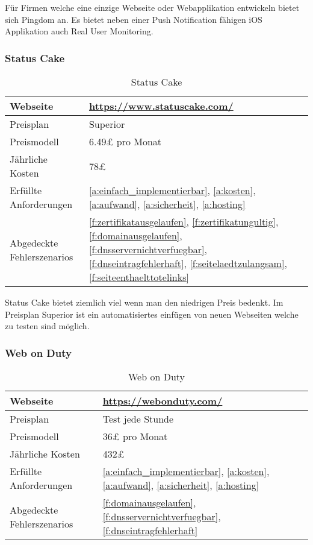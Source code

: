 Für Firmen welche eine einzige Webseite oder Webapplikation entwickeln bietet sich Pingdom an. Es bietet neben einer Push Notification fähigen iOS Applikation auch Real User Monitoring.

\subsubsection{Status Cake}
\label{ssub:status_cake}

\begin{table}[h!]
  \centering
  \begin{tabular}{p{5cm} p{7cm}}
  \toprule
    Webseite & \url{https://www.statuscake.com/}\\
  \hline
    Preisplan & Superior\\
  \hline
    Preismodell & 6.49£ pro Monat\\
  \hline
    Jährliche Kosten & 78£\\
  \hline
    Erfüllte Anforderungen & \ref{a:einfach_implementierbar}, \ref{a:kosten}, \ref{a:aufwand}, \ref{a:sicherheit}, \ref{a:hosting}\\
  \hline
    Abgedeckte Fehlerszenarios & \ref{f:zertifikatausgelaufen}, \ref{f:zertifikatungultig}, \ref{f:domainausgelaufen}, \ref{f:dnsservernichtverfuegbar}, \ref{f:dnseintragfehlerhaft}, \ref{f:seitelaedtzulangsam}, \ref{f:seiteenthaelttotelinks}\\
  \bottomrule
  \end{tabular}
  \caption{Status Cake}
  \label{tab:status_cake}
\end{table}

Status Cake bietet ziemlich viel wenn man den niedrigen Preis bedenkt. Im Preisplan Superior ist ein automatisiertes einfügen von neuen Webseiten welche zu testen sind möglich.

\subsubsection{Web on Duty}
\label{ssub:web_on_duty}

\begin{table}[h!]
  \centering
  \begin{tabular}{p{5cm} p{7cm}}
  \toprule
    Webseite & \url{https://webonduty.com/}\\
  \hline
    Preisplan & Test jede Stunde\\
  \hline
    Preismodell & 36£ pro Monat\\
  \hline
    Jährliche Kosten & 432£\\
  \hline
    Erfüllte Anforderungen & \ref{a:einfach_implementierbar}, \ref{a:kosten}, \ref{a:aufwand}, \ref{a:sicherheit}, \ref{a:hosting}\\
  \hline
    Abgedeckte Fehlerszenarios & \ref{f:domainausgelaufen}, \ref{f:dnsservernichtverfuegbar}, \ref{f:dnseintragfehlerhaft}\\
  \bottomrule
  \end{tabular}
  \caption{Web on Duty}
  \label{tab:web_on_duty}
\end{table}


